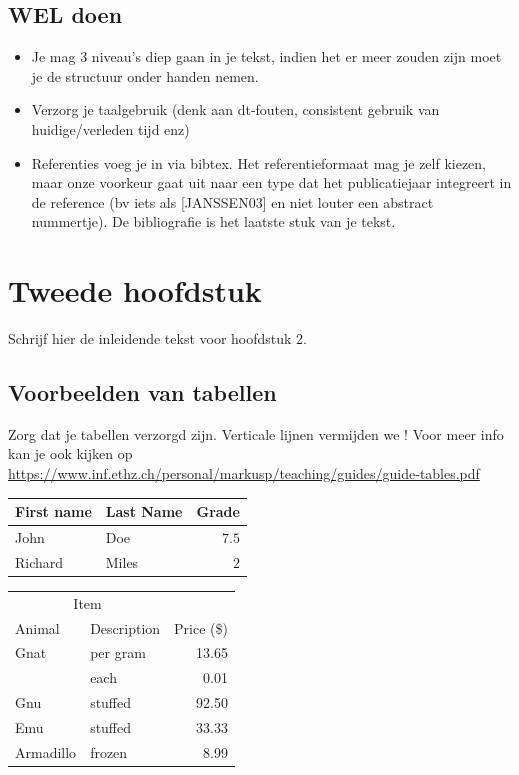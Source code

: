 \documentclass{book}
\begin{document}
\section{WEL doen}
\begin{itemize}
\item Je mag 3 niveau's diep gaan in je tekst, indien het er meer zouden zijn moet je de structuur onder handen nemen. 
\item Verzorg je taalgebruik (denk aan dt-fouten, consistent gebruik van huidige/verleden tijd enz)
\item Referenties voeg je in via bibtex. Het referentieformaat mag je zelf kiezen, maar onze voorkeur gaat uit naar een type dat het publicatiejaar integreert in de reference (bv iets als [JANSSEN03] en niet louter een abstract nummertje). De bibliografie is het laatste stuk van je tekst.

\end{itemize}


\chapter{Tweede hoofdstuk}
\label{tweede_hs}

Schrijf hier de inleidende tekst voor hoofdstuk 2.


\section{Voorbeelden van tabellen}

Zorg dat je tabellen verzorgd zijn. Verticale lijnen vermijden we ! Voor meer info kan je ook kijken op \url{https://www.inf.ethz.ch/personal/markusp/teaching/guides/guide-tables.pdf}

  \begin{tabular}{llr}
  \toprule
  First name & Last Name & Grade \\
  \midrule
  John & Doe & $7.5$ \\
  Richard & Miles & $2$ \\
  \bottomrule
  \end{tabular}

  \vspace{0.5cm}

  \begin{tabular}{llr}  
    \toprule
    \multicolumn{2}{c}{Item} \\
    \cmidrule(r){1-2}
    Animal    & Description & Price (\$) \\
    \midrule
    Gnat      & per gram    & 13.65      \\
          &    each     & 0.01       \\
    Gnu       & stuffed     & 92.50      \\
    Emu       & stuffed     & 33.33      \\
    Armadillo & frozen      & 8.99       \\
    \bottomrule
  \end{tabular}
\end{document}
